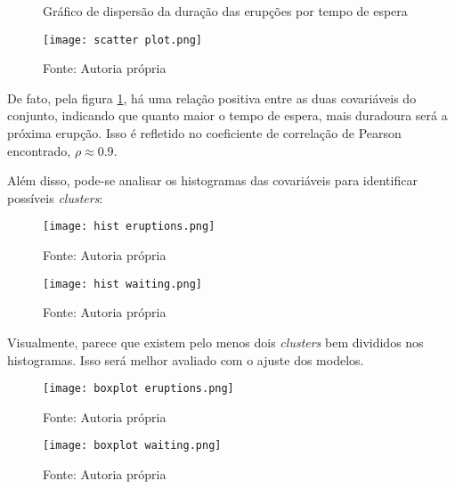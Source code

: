 \documentclass[12pt]{article}
\begin{document}
\begin{figure}[H]
    \centering
    \caption{Gráfico de dispersão da duração das erupções por tempo de espera}
    \texttt{[image: scatter plot.png]}
    \caption*{Fonte: Autoria própria}\label{scatter}
\end{figure}

De fato, pela figura \ref{scatter}, há uma relação positiva entre as duas covariáveis do conjunto, indicando que quanto maior o tempo de espera, mais duradoura será a próxima erupção. Isso é refletido no coeficiente de correlação de Pearson encontrado, $\rho \approx 0.9$.

Além disso, pode-se analisar os histogramas das covariáveis para identificar possíveis \textit{clusters}:

\begin{figure}[H]
    \centering
    \begin{minipage}{0.45\textwidth}
        \centering
        \caption{}\label{fig:hist erupt}
        \texttt{[image: hist eruptions.png]}
        \caption*{Fonte: Autoria própria}
    \end{minipage}
    \hfill
    \begin{minipage}{0.45\textwidth}
        \centering
        \caption{}\label{fig:hist wait}
        \texttt{[image: hist waiting.png]}
        \caption*{Fonte: Autoria própria}
    \end{minipage}
\end{figure}

Visualmente, parece que existem pelo menos dois \textit{clusters} bem divididos nos histogramas. Isso será melhor avaliado com o ajuste dos modelos.

\begin{figure}[H]
    \centering
    \begin{minipage}{0.45\textwidth}
        \caption{}\label{fig:boxplot erupt}
        \texttt{[image: boxplot eruptions.png]}
        \caption*{Fonte: Autoria própria}
    \end{minipage}
    \hfill
    \begin{minipage}{0.45\textwidth}
        \centering
        \caption{}\label{fig:boxplot wait}
        \texttt{[image: boxplot waiting.png]}
        \caption*{Fonte: Autoria própria}
    \end{minipage}
\end{figure}
\end{document}
